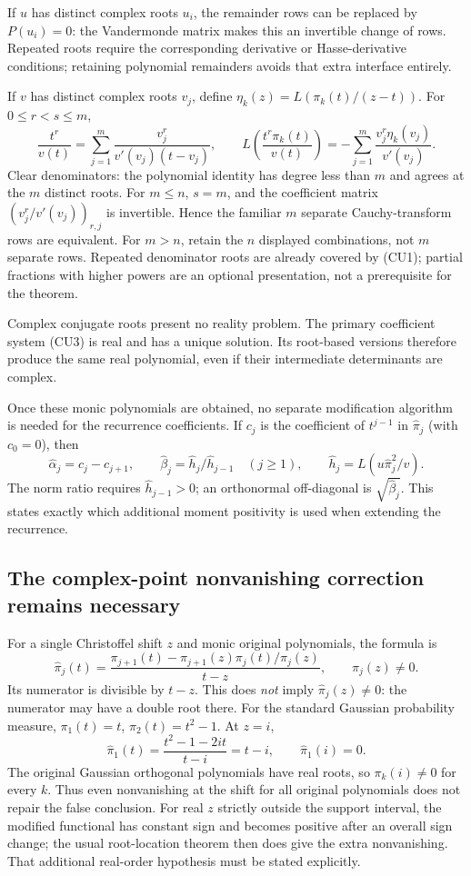 \documentclass[11pt,a4paper]{article}
\theoremstyle{definition}
\begin{document}
If $u$ has distinct complex roots $u_i$, the remainder rows can be
replaced by $P(u_i)=0$: the Vandermonde matrix makes this an invertible
change of rows. Repeated roots require the corresponding derivative
or Hasse-derivative conditions; retaining polynomial remainders
avoids that extra interface entirely.

If $v$ has distinct complex roots $v_j$, define
$\eta_k(z)=L(\pi_k(t)/(z-t))$. For $0\le r<s\le m$,
\[
 \frac{t^r}{v(t)}=
 \sum_{j=1}^m\frac{v_j^r}{v'(v_j)(t-v_j)},\qquad
 L\!\left(\frac{t^r\pi_k(t)}{v(t)}\right)
 =-\sum_{j=1}^m\frac{v_j^r\eta_k(v_j)}{v'(v_j)}.
 \tag{CU9}
\]
Clear denominators: the polynomial identity has degree less than
$m$ and agrees at the $m$ distinct roots. For $m\le n$, $s=m$,
and the coefficient matrix $(v_j^r/v'(v_j))_{r,j}$ is invertible.
Hence the familiar $m$ separate Cauchy-transform rows are equivalent.
For $m>n$, retain the $n$ displayed combinations, not $m$ separate
rows. Repeated denominator roots are already covered by (CU1);
partial fractions with higher powers are an optional presentation,
not a prerequisite for the theorem.

Complex conjugate roots present no reality problem. The primary
coefficient system (CU3) is real and has a unique solution. Its
root-based versions therefore produce the same real polynomial,
even if their intermediate determinants are complex.

Once these monic polynomials are obtained, no separate modification
algorithm is needed for the recurrence coefficients. If $c_j$ is
the coefficient of $t^{j-1}$ in $\widehat\pi_j$ (with $c_0=0$), then
\[
 \widehat\alpha_j=c_j-c_{j+1},\qquad
 \widehat\beta_j=\widehat h_j/\widehat h_{j-1}\quad(j\ge1),
 \qquad \widehat h_j=L(u\widehat\pi_j^2/v).
\]
The norm ratio requires $\widehat h_{j-1}>0$; an orthonormal
off-diagonal is $\sqrt{\widehat\beta_j}$. This states exactly which
additional moment positivity is used when extending the recurrence.

\subsection{The complex-point nonvanishing correction remains necessary}

For a single Christoffel shift $z$ and monic original polynomials,
the formula is
\[
 \widehat\pi_j(t)=
 \frac{\pi_{j+1}(t)-\pi_{j+1}(z)\pi_j(t)/\pi_j(z)}{t-z},
 \qquad \pi_j(z)\ne0.
 \tag{CU10}
\]
Its numerator is divisible by $t-z$. This does \emph{not} imply
$\widehat\pi_j(z)\ne0$: the numerator may have a double root there.
For the standard Gaussian probability measure,
$\pi_1(t)=t$, $\pi_2(t)=t^2-1$. At $z=i$,
\[
 \widehat\pi_1(t)=\frac{t^2-1-2it}{t-i}=t-i,
 \qquad \widehat\pi_1(i)=0.
 \tag{CU11}
\]
The original Gaussian orthogonal polynomials have real roots, so
$\pi_k(i)\ne0$ for every $k$. Thus even nonvanishing at the shift
for all original polynomials does not repair the false conclusion.
For real $z$ strictly outside the support interval, the modified
functional has constant sign and becomes positive after an overall
sign change; the usual root-location theorem then does give the
extra nonvanishing. That additional real-order hypothesis must be
stated explicitly.
\end{document}
